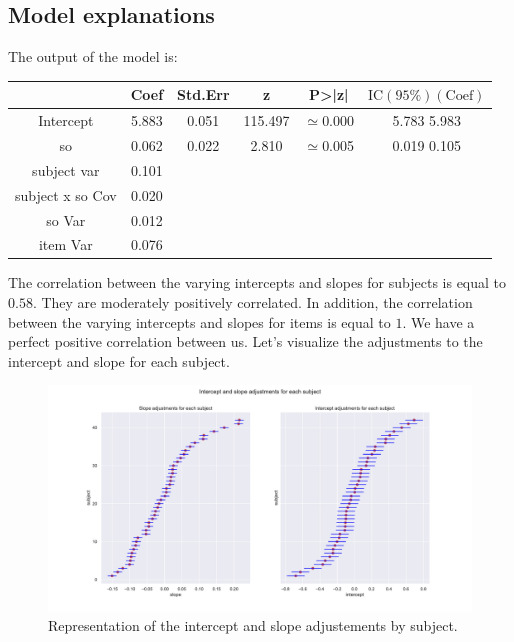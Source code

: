 \documentclass{article}
\begin{document}
\subsection{Model explanations}
The output of the model is:
\begin{center}
    \begin{tabular}{|c|c|c|c|c|c|}
    \hline
         & Coef & Std.Err & z & P>|z| & $\text{IC}(95\%)(\text{Coef})$ \\
         \hline \hline
        Intercept & 5.883 & 0.051 & 115.497 & $\simeq$0.000 & 5.783 5.983\\
         so & 0.062 & 0.022 & 2.810 & $\simeq$0.005 & 0.019 0.105 \\
         subject var &  0.101 &  &  & & \\
         subject x so Cov & 0.020 &  & & &\\
         so Var & 0.012 &  & & &\\
         item Var & 0.076 & & & &\\
         \hline
    \end{tabular}
\end{center}
The correlation between the varying intercepts and slopes for subjects is equal to $0.58$. They are moderately positively correlated.
In addition, the correlation between the varying intercepts and slopes for items is equal to $1$. We have a perfect positive correlation between us.
Let's visualize the adjustments to the intercept and slope for each subject.

\begin{figure}[H]
    \centering
    \includegraphics[scale=.42]{./images/model3_inter.pdf}
    \caption{Representation of the intercept and slope adjustements by subject.}
    \label{fig:model3}
\end{figure}
\end{document}
